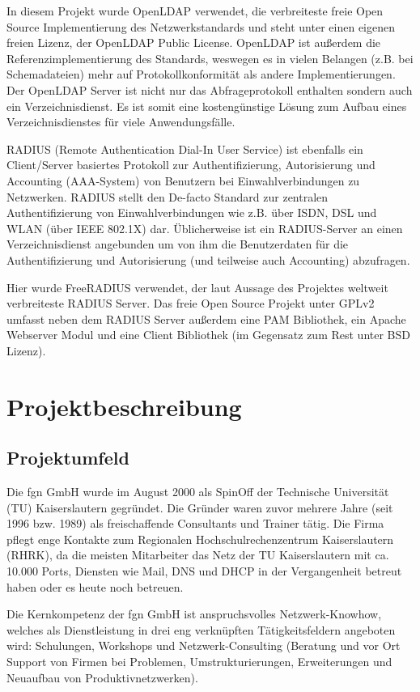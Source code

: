 \documentclass[11pt,a4paper,titlepage=firstiscover,headsepline]{scrartcl} %
\begin{document}
In diesem Projekt wurde OpenLDAP verwendet, die verbreiteste freie Open Source Implementierung des Netzwerkstandards und steht unter einen eigenen freien Lizenz, der OpenLDAP Public License. OpenLDAP ist außerdem die Referenzimplementierung des Standards, weswegen es in vielen Belangen (z.B. bei Schemadateien) mehr auf Protokollkonformität als andere Implementierungen. Der OpenLDAP Server ist nicht nur das Abfrageprotokoll enthalten sondern auch ein Verzeichnisdienst. Es ist somit eine kostengünstige Lösung zum Aufbau eines Verzeichnisdienstes für viele Anwendungsfälle.

RADIUS (Remote Authentication Dial-In User Service) ist ebenfalls ein Client/Server basiertes Protokoll zur Authentifizierung, Autorisierung und Accounting (AAA-System) von Benutzern bei Einwahlverbindungen zu Netzwerken. RADIUS stellt den De-facto Standard zur zentralen Authentifizierung von Einwahlverbindungen wie z.B. über ISDN, DSL und WLAN (über IEEE 802.1X) dar. Üblicherweise ist ein RADIUS-Server an einen Verzeichnisdienst angebunden um von ihm die Benutzerdaten für die Authentifizierung und Autorisierung (und teilweise auch Accounting) abzufragen.

Hier wurde FreeRADIUS verwendet, der laut Aussage des Projektes weltweit verbreiteste RADIUS Server. Das freie Open Source Projekt unter GPLv2 umfasst neben dem RADIUS Server außerdem eine PAM Bibliothek, ein Apache Webserver Modul und eine Client Bibliothek (im Gegensatz zum Rest unter BSD Lizenz).

\section{Projektbeschreibung}
\subsection{Projektumfeld}
Die fgn GmbH wurde im August 2000 als SpinOff der Technische Universität (TU) Kaiserslautern gegründet. Die Gründer waren zuvor mehrere Jahre (seit 1996 bzw. 1989) als freischaffende Consultants und Trainer tätig. Die Firma pflegt enge Kontakte zum Regionalen Hochschulrechenzentrum Kaiserslautern (RHRK), da die meisten Mitarbeiter das Netz der TU Kaiserslautern mit ca. 10.000 Ports, Diensten wie Mail, DNS und DHCP in der Vergangenheit betreut haben oder es heute noch betreuen.

Die Kernkompetenz der fgn GmbH ist anspruchsvolles Netzwerk-Knowhow, welches als Dienstleistung in drei eng verknüpften Tätigkeitsfeldern angeboten wird: Schulungen, Workshops und Netzwerk-Consulting (Beratung und vor Ort Support von Firmen bei Problemen, Umstrukturierungen, Erweiterungen und Neuaufbau von Produktivnetzwerken).
\end{document}
